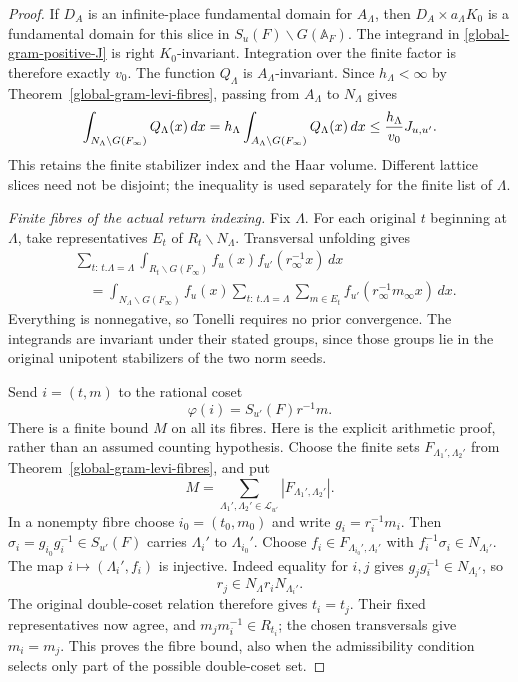 \begin{proof}
If $D_A$ is an infinite-place fundamental domain for $A_\Lambda$,
then $D_A\times a_\Lambda K_0$ is a fundamental domain for
this slice in $S_u(F)\backslash G(\mathbb A_F)$.
The integrand in \eqref{global-gram-positive-J} is right $K_0$-invariant.
Integration over the finite factor is therefore exactly $v_0$.
The function $Q_\Lambda$ is $A_\Lambda$-invariant.  Since
$h_\Lambda<\infty$ by Theorem~\ref{global-gram-levi-fibres},
passing from $A_\Lambda$ to $N_\Lambda$ gives
\begin{equation}\label{global-gram-slice}
 \int_{N_\Lambda\backslash G(F_\infty)}Q_\Lambda(x)\,dx
 =h_\Lambda\int_{A_\Lambda\backslash G(F_\infty)}Q_\Lambda(x)\,dx
 \le {h_\Lambda\over v_0}J_{u,u'}.
\end{equation}
This retains the finite stabilizer index and the Haar volume.
Different lattice slices need not be disjoint; the inequality
is used separately for the finite list of $\Lambda$.

\emph{Finite fibres of the actual return indexing.}
Fix $\Lambda$.  For each original $t$ beginning at $\Lambda$,
take representatives $E_t$ of $R_t\backslash N_\Lambda$.
Transversal unfolding gives
\begin{align*}
 &\sum_{t:\,t.\Lambda=\Lambda}
    \int_{R_t\backslash G(F_\infty)}
                         f_u(x)f_{u'}(r_\infty^{-1}x)\,dx\\
 &\quad=\int_{N_\Lambda\backslash G(F_\infty)}
      f_u(x)\sum_{t:\,t.\Lambda=\Lambda}\sum_{m\in E_t}
                         f_{u'}(r_\infty^{-1}m_\infty x)\,dx .
\end{align*}
Everything is nonnegative, so Tonelli requires no prior
convergence.  The integrands are invariant under their stated
groups, since those groups lie in the original unipotent
stabilizers of the two norm seeds.

Send $i=(t,m)$ to the rational coset
\[
                 \varphi(i)=S_{u'}(F)r^{-1}m.
\]
There is a finite bound $M$ on all its fibres.  Here is the
explicit arithmetic proof, rather than an assumed counting
hypothesis.  Choose the finite sets $F_{\Lambda_1',\Lambda_2'}$
from Theorem~\ref{global-gram-levi-fibres}, and put
\[
 M=\sum_{\Lambda_1',\Lambda_2'\in\mathcal L_{u'}}
                              |F_{\Lambda_1',\Lambda_2'}|.
\]
In a nonempty fibre choose $i_0=(t_0,m_0)$ and write
$g_i=r_i^{-1}m_i$.  Then
$\sigma_i=g_{i_0}g_i^{-1}\in S_{u'}(F)$ carries
$\Lambda_i'$ to $\Lambda_{i_0}'$.  Choose
$f_i\in F_{\Lambda_{i_0}',\Lambda_i'}$ with
$f_i^{-1}\sigma_i\in N_{\Lambda_i'}$.
The map $i\mapsto(\Lambda_i',f_i)$ is injective.
Indeed equality for $i,j$ gives $g_jg_i^{-1}\in N_{\Lambda_i'}$,
so
\[
 r_j\in N_\Lambda r_iN_{\Lambda_i'}.
\]
The original double-coset relation therefore gives $t_i=t_j$.
Their fixed representatives now agree, and
$m_jm_i^{-1}\in R_{t_i}$; the chosen transversals give $m_i=m_j$.
This proves the fibre bound, also when the admissibility condition
selects only part of the possible double-coset set.


\end{proof}
